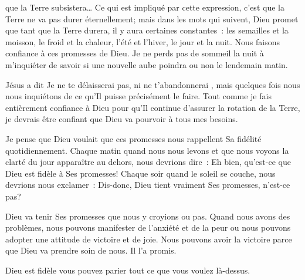 
 que la Terre subsistera\dots{} \fg{} Ce qui est
 impliqué par cette expression, c'est que la Terre ne va pas durer éternellement;
 mais dans les mots qui suivent, Dieu promet que tant que la Terre durera, il y
 aura certaines constantes~: les semailles et la moisson, le froid et la chaleur,
 l'été et l'hiver, le jour et la nuit. Nous faisons confiance à ces promesses de
 Dieu. Je ne perds pas de sommeil la nuit à m'inquiéter de savoir si une nouvelle
 aube poindra ou non le lendemain matin. 


Jésus a dit \og Je ne te délaisserai pas, ni ne t'abandonnerai \fg{}, mais
 quelques fois nous nous inquiétons de ce qu'Il puisse précisément le faire.
 Tout comme je fais entièrement confiance à Dieu pour qu'Il continue d'assurer
 la rotation de la Terre, je devrais être confiant que Dieu va pourvoir à tous
 mes besoins.

Je pense que Dieu voulait que ces promesses nous rappellent Sa fidélité
 quotidiennement. Chaque matin quand nous nous levons et que nous voyons la
 clarté du jour apparaître au dehors, nous devrions dire~: \og Eh bien, qu'est-ce
 que Dieu est fidèle à Ses promesses! \fg{} Chaque soir quand le soleil se
 couche, nous devrions nous exclamer~: \og Dis-donc, Dieu tient vraiment Ses
 promesses, n'est-ce pas? \fg{}

Dieu va tenir Ses promesses que nous y croyions ou pas. Quand nous avons des
 problèmes, nous pouvons manifester de l'anxiété et de la peur ou nous pouvons
 adopter une attitude de victoire et de joie. Nous pouvons avoir la victoire
 parce que Dieu va prendre soin de nous. Il l'a promis.

Dieu est fidèle \ocadr{}vous pouvez parier tout ce que vous voulez là-dessus. 

\dvrule





